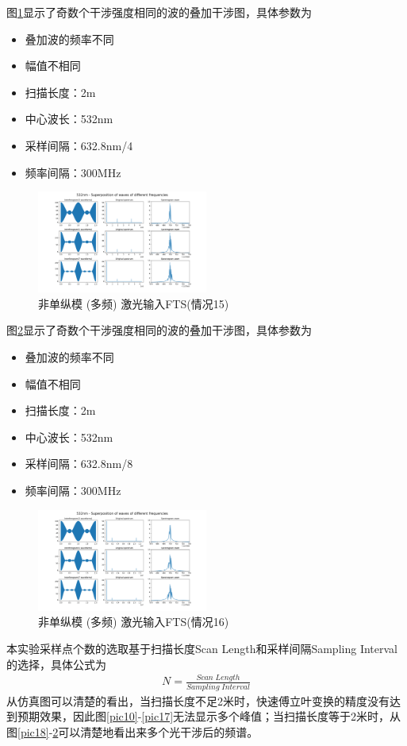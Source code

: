 \documentclass[conference]{IEEEtran}
\begin{document}
图\ref{pic24}显示了奇数个干涉强度相同的波的叠加干涉图，具体参数为
\begin{itemize}
    \item 叠加波的频率不同
    \item 幅值不相同
    \item 扫描长度：2m
    \item 中心波长：532nm
    \item 采样间隔：632.8nm/4
    \item 频率间隔：300MHz
\end{itemize}
\begin{figure}[htbp]
    \centerline{\includegraphics[width=0.5\textwidth]{pic24.png}}
    \caption{非单纵模 (多频) 激光输入FTS(情况15)}
    \label{pic24}
\end{figure}

图\ref{pic25}显示了奇数个干涉强度相同的波的叠加干涉图，具体参数为
\begin{itemize}
    \item 叠加波的频率不同
    \item 幅值不相同
    \item 扫描长度：2m
    \item 中心波长：532nm
    \item 采样间隔：632.8nm/8
    \item 频率间隔：300MHz
\end{itemize}
\begin{figure}[htbp]
    \centerline{\includegraphics[width=0.5\textwidth]{pic25.png}}
    \caption{非单纵模 (多频) 激光输入FTS(情况16)}
    \label{pic25}
\end{figure}

本实验采样点个数的选取基于扫描长度Scan Length和采样间隔Sampling Interval的选择，具体公式为
\begin{align}
    N = \frac{Scan\;Length}{Sampling\;Interval}
\end{align}
从仿真图可以清楚的看出，当扫描长度不足2米时，快速傅立叶变换的精度没有达到预期效果，因此图\ref{pic10}-\ref{pic17}无法显示多个峰值；当扫描长度等于2米时，从图\ref{pic18}-\ref{pic25}可以清楚地看出来多个光干涉后的频谱。
\end{document}

